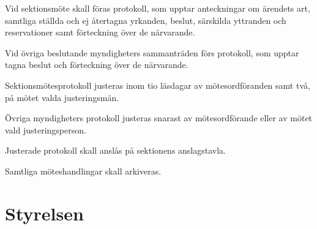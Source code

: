 \documentclass[stadgar]{dsekprotokoll}
\begin{document}
\begin{stadgeavsnitt}


Vid sektionsmöte skall föras protokoll, som upptar anteckningar om ärendets
art, samtliga ställda och ej återtagna yrkanden, beslut, särskilda
yttranden och reservationer samt förteckning över de närvarande.


Vid övriga beslutande myndigheters sammanträden förs protokoll, som upptar
tagna beslut och förteckning över de närvarande.


Sektionsmötesprotokoll justeras inom tio läsdagar av mötesordföranden samt
två, på mötet valda justeringsmän.

Övriga myndigheters protokoll justeras snarast av mötesordförande eller av mötet vald justeringsperson.


Justerade protokoll skall anslås på sektionens anslagstavla.


Samtliga möteshandlingar skall arkiveras.

\end{stadgeavsnitt}

\section{Styrelsen}
\end{document}
